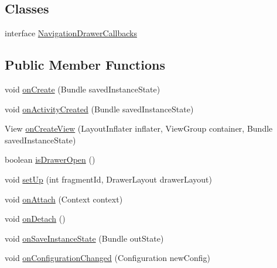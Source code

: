 \subsection*{Classes}
\begin{DoxyCompactItemize}
\item 
interface \hyperlink{interfaceorg_1_1buildmlearn_1_1toolkit_1_1fragment_1_1NavigationDrawerFragment_1_1NavigationDrawerCallbacks}{Navigation\+Drawer\+Callbacks}
\end{DoxyCompactItemize}
\subsection*{Public Member Functions}
\begin{DoxyCompactItemize}
\item 
void \hyperlink{classorg_1_1buildmlearn_1_1toolkit_1_1fragment_1_1NavigationDrawerFragment_a7a9c297215fb754ea5bd3745233cec21}{on\+Create} (Bundle saved\+Instance\+State)
\item 
void \hyperlink{classorg_1_1buildmlearn_1_1toolkit_1_1fragment_1_1NavigationDrawerFragment_a734263415ae5341ea1cb5b4b2a469581}{on\+Activity\+Created} (Bundle saved\+Instance\+State)
\item 
View \hyperlink{classorg_1_1buildmlearn_1_1toolkit_1_1fragment_1_1NavigationDrawerFragment_a960b71d9ccecc621b4a5506f38a105cf}{on\+Create\+View} (Layout\+Inflater inflater, View\+Group container, Bundle saved\+Instance\+State)
\item 
boolean \hyperlink{classorg_1_1buildmlearn_1_1toolkit_1_1fragment_1_1NavigationDrawerFragment_a85975c4bf9994479fb882843b31988b5}{is\+Drawer\+Open} ()
\item 
void \hyperlink{classorg_1_1buildmlearn_1_1toolkit_1_1fragment_1_1NavigationDrawerFragment_a6ec051ce4329da7861cc19a0e01ed01b}{set\+Up} (int fragment\+Id, Drawer\+Layout drawer\+Layout)
\item 
void \hyperlink{classorg_1_1buildmlearn_1_1toolkit_1_1fragment_1_1NavigationDrawerFragment_a4d9c5606213fdedc3d28d34d6c7fb7d5}{on\+Attach} (Context context)
\item 
void \hyperlink{classorg_1_1buildmlearn_1_1toolkit_1_1fragment_1_1NavigationDrawerFragment_af5ec3253d086d2733aea3a595061c389}{on\+Detach} ()
\item 
void \hyperlink{classorg_1_1buildmlearn_1_1toolkit_1_1fragment_1_1NavigationDrawerFragment_a3ecc348d09897125baff9673c4145a55}{on\+Save\+Instance\+State} (Bundle out\+State)
\item 
void \hyperlink{classorg_1_1buildmlearn_1_1toolkit_1_1fragment_1_1NavigationDrawerFragment_aa216d0cfc2c54c3cd6c9f91cb005cea1}{on\+Configuration\+Changed} (Configuration new\+Config)

\end{DoxyCompactItemize}
